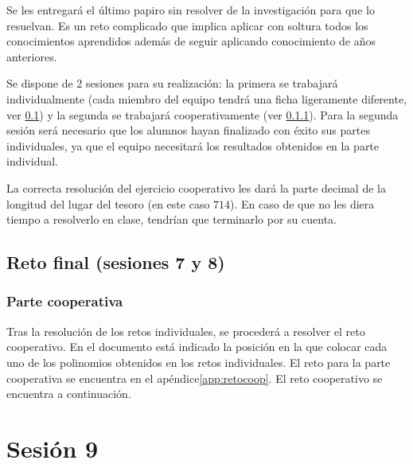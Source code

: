 Se les entregará el último papiro sin resolver de la investigación para que lo resuelvan.
%
Es un reto complicado que implica aplicar con soltura todos los conocimientos aprendidos además de seguir aplicando conocimiento de años anteriores.


Se dispone de 2 sesiones para su realización: la primera se trabajará individualmente (cada miembro del equipo tendrá una ficha ligeramente diferente, ver \ref{ses7:indiv}) y la segunda se trabajará cooperativamente (ver \ref{ses7:coop}).
%
Para la segunda sesión será necesario que los alumnos hayan finalizado con éxito sus partes individuales, ya que el equipo necesitará los resultados obtenidos en la parte individual.

La correcta resolución del ejercicio cooperativo les dará la parte decimal de la longitud del lugar del tesoro (en este caso $714$).
%
En caso de que no les diera tiempo a resolverlo en clase, tendrían que terminarlo por su cuenta.


\subsection{Reto final (sesiones 7 y 8)}
\label{ses7:indiv}




\subsubsection{Parte cooperativa}
\label{ses7:coop}

Tras la resolución de los retos individuales, se procederá a resolver el reto cooperativo.
%
En el documento está indicado la posición en la que colocar cada uno de los polinomios obtenidos en los retos individuales.
%
\ifinapp
	El reto para la parte cooperativa se encuentra en el apéndice\ref{app:retocoop}.
\else 
	El reto cooperativo se encuentra a continuación.
	
\fi







\section{Sesión 9}



